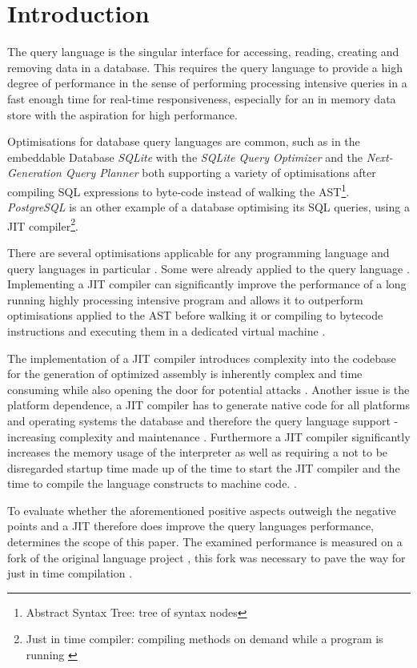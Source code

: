 \chapter{Introduction}

The query language is the singular interface for accessing, reading, creating
and removing data in a database. This requires the query language to provide a
high degree of performance in the sense of performing processing intensive
queries in a fast enough time for real-time responsiveness, especially for an
in memory data store with the aspiration for high performance.

Optimisations for database query languages are common, such as in the
embeddable Database \textit{SQLite} with the \textit{SQLite Query
Optimizer}\cite{sqlite_query_opt} and the \textit{Next-Generation Query
Planner}\cite{sqlite_query_opt} both supporting a variety of optimisations
after compiling SQL expressions to byte-code instead of walking the
AST\footnote{Abstract Syntax Tree: tree of syntax
nodes}\cite{sqlite_next_gen_query_plan}. \textit{PostgreSQL} is an other
example of a database optimising its SQL queries, using a JIT compiler\footnote{Just in
time compiler: compiling methods on demand while a program is running \cite[1.
Introduction]{java_jit_compilation}}\cite{postgres_jit}.

There are several optimisations applicable for any programming language and
query languages in particular \cite[3.3 Optimisations]{java_jit_region_based}.
Some were already applied to the query language \cite{parser2_opt}.
Implementing a JIT compiler can significantly improve the performance of a long
running highly processing intensive program and allows it to outperform
optimisations applied to the AST before walking it or compiling to bytecode
instructions and executing them in a dedicated virtual machine \cite[4.
Results]{java_jit_compilation}. 

The implementation of a JIT compiler introduces complexity into the codebase
for the generation of optimized assembly is inherently complex and time
consuming \cite[1. Introduction]{impl_jit} while also opening the door for
potential attacks \cite[2. Challenges Securing JavaScript JIT]{js_jit_fuzzing}
\cite[Table 1.]{js_jit_fuzzing}. Another issue is the platform dependence, a
JIT compiler has to generate native code for all platforms and operating
systems the database and therefore the query language support - increasing
complexity and maintenance \cite[Abstract]{java_jit_effectiveness}. Furthermore
a JIT compiler significantly increases the memory usage \cite[Fig.
1.]{brief_history_of_jit} of the interpreter as well as requiring a not to be
disregarded startup time made up of the time to start the JIT compiler and the
time to compile the language constructs to machine code. \cite[4.2.7 Breakdown
of compilation times]{java_jit_effectiveness}.

To evaluate whether the aforementioned positive aspects outweigh the negative
points and a JIT therefore does improve the query languages performance,
determines the scope of this paper. The examined performance is measured on a
fork of the original language project \cite{parser2_hneemann}, this fork was
necessary to pave the way for just in time compilation \cite{parser2_xnacly}.
